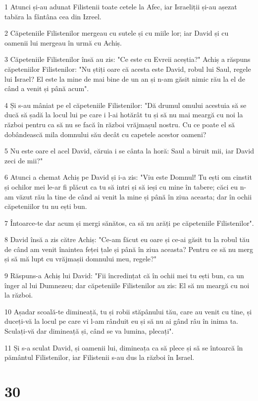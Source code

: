 \par 1 Atunci și-au adunat Filistenii toate cetele la Afec, iar Israeliții și-au așezat tabăra la fântâna cea din Izreel.
\par 2 Căpeteniile Filistenilor mergeau cu sutele și cu miile lor; iar David și cu oamenii lui mergeau în urmă cu Achiș.
\par 3 Căpeteniile Filistenilor însă au zis: "Ce este cu Evreii aceștia?" Achiș a răspuns căpeteniilor Filistenilor: "Nu știți oare că acesta este David, robul lui Saul, regele lui Israel? El este la mine de mai bine de un an și n-am găsit nimic rău la el de când a venit și până acum".
\par 4 Și s-au mâniat pe el căpeteniile Filistenilor: "Dă drumul omului acestuia să se ducă să șadă la locul lui pe care i l-ai hotărât tu și să nu mai meargă cu noi la război pentru ca să nu se facă în război vrăjmașul nostru. Cu ce poate el să dobândească mila domnului său decât cu capetele acestor oameni?
\par 5 Nu este oare el acel David, căruia i se cânta la horă: Saul a biruit mii, iar David zeci de mii?"
\par 6 Atunci a chemat Achiș pe David și i-a zis: "Viu este Domnul! Tu ești om cinstit și ochilor mei le-ar fi plăcut ca tu să intri și să ieși cu mine în tabere; căci eu n-am văzut rău la tine de când ai venit la mine și până în ziua aceasta; dar în ochii căpeteniilor tu nu ești bun.
\par 7 Întoarce-te dar acum și mergi sănătos, ca să nu arăți pe căpeteniile Filistenilor".
\par 8 David însă a zis către Achiș: "Ce-am făcut eu oare și ce-ai găsit tu la robul tău de când am venit înaintea feței țale și până în ziua aceasta? Pentru ce să nu merg și să mă lupt cu vrăjmașii domnului meu, regele?"
\par 9 Răspuns-a Achiș lui David: "Fii încredințat că în ochii mei tu ești bun, ca un înger al lui Dumnezeu; dar căpeteniile Filistenilor au zis: El să nu meargă cu noi la război.
\par 10 Așadar scoală-te dimineață, tu și robii stăpânului tău, care au venit cu tine, și duceți-vă la locul pe care vi l-am rânduit eu și să nu ai gând râu în inima ta. Sculați-vă dar dimineață și, când se va lumina, plecați".
\par 11 Și s-a sculat David, și oamenii lui, dimineața ca să plece și să se întoarcă în pământul Filistenilor, iar Filistenii s-au dus la război în Israel.

\chapter{30}

